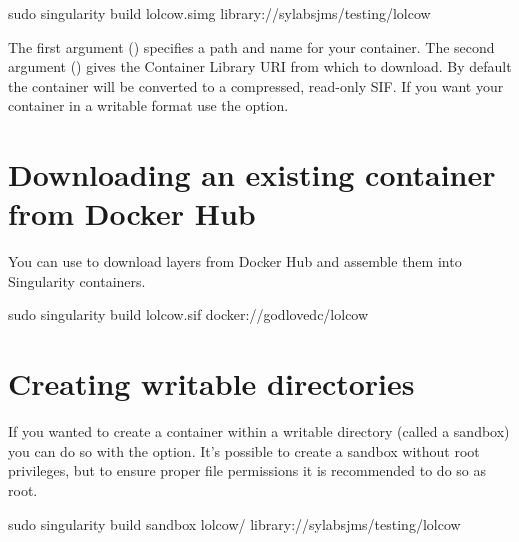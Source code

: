 \documentclass[letterpaper,10pt,english]{sphinxmanual}
\begin{document}
%
\begin{sphinxVerbatim}[commandchars=\\\{\}]
\PYGZdl{} sudo singularity build lolcow.simg library://sylabs\PYGZhy{}jms/testing/lolcow
\end{sphinxVerbatim}

The first argument () specifies a path and name for your
container. The second argument () gives
the Container Library URI from which to download. By default the container will
be converted to a compressed, read-only SIF. If you want your container in a
writable format use the  option.


\section{Downloading an existing container from Docker Hub}
\label{\detokenize{build_a_container:downloading-an-existing-container-from-docker-hub}}
You can use  to download layers from Docker Hub and assemble them into
Singularity containers.

%
\begin{sphinxVerbatim}[commandchars=\\\{\}]
\PYGZdl{} sudo singularity build lolcow.sif docker://godlovedc/lolcow
\end{sphinxVerbatim}


\section{Creating writable  directories}
\label{\detokenize{build_a_container:creating-writable-sandbox-directories}}
If you wanted to create a container within a writable directory (called a
sandbox) you can do so with the  option. It’s possible to create a
sandbox without root privileges, but to ensure proper file permissions it is
recommended to do so as root.

%
\begin{sphinxVerbatim}[commandchars=\\\{\}]
\PYGZdl{} sudo singularity build \PYGZhy{}\PYGZhy{}sandbox lolcow/ library://sylabs\PYGZhy{}jms/testing/lolcow
\end{sphinxVerbatim}
\end{document}
